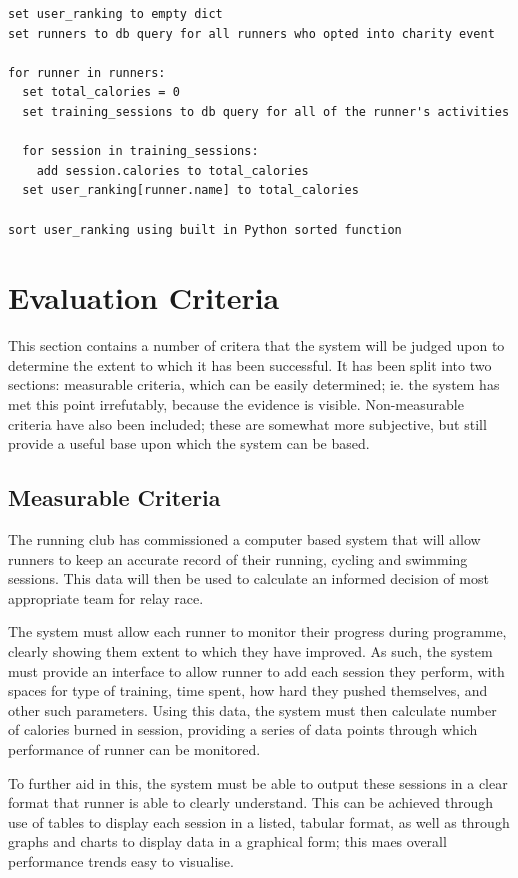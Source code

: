 \documentclass{article}[12pt,a4paper]
\begin{document}
\begin{verbatim}
set user_ranking to empty dict
set runners to db query for all runners who opted into charity event

for runner in runners:
  set total_calories = 0
  set training_sessions to db query for all of the runner's activities

  for session in training_sessions:
    add session.calories to total_calories
  set user_ranking[runner.name] to total_calories

sort user_ranking using built in Python sorted function
\end{verbatim}

 
\section{Evaluation Criteria}
This section contains a number of critera that the system will be judged upon to determine the extent to which it has been successful. It has been split into two sections: measurable criteria, which can be easily determined; ie. the system has met this point irrefutably, because the evidence is visible. Non-measurable criteria have also been included; these are somewhat more subjective, but still provide a useful base upon which the system can be based.

\subsection{Measurable Criteria}
The running club has commissioned  a computer based system that will allow runners to keep an accurate record of their running, cycling and swimming sessions. This data will then be used to calculate an informed decision of most appropriate team for relay race.

The system must allow each runner to monitor their progress during programme, clearly showing them extent to which they have improved. As such, the system must provide an interface to allow runner to add each session they perform, with spaces for type of training, time spent, how hard they pushed themselves, and other such parameters. Using this data, the system must then calculate number of calories burned in session, providing a series of data points through which performance of runner can be monitored.

To further aid in this, the system must be able to output these sessions in a clear format that runner is able to clearly understand. This can be achieved through use of tables to display each session in a listed, tabular format, as well as through graphs and charts to display data in a graphical form; this maes overall performance trends easy to visualise.
\end{document}

